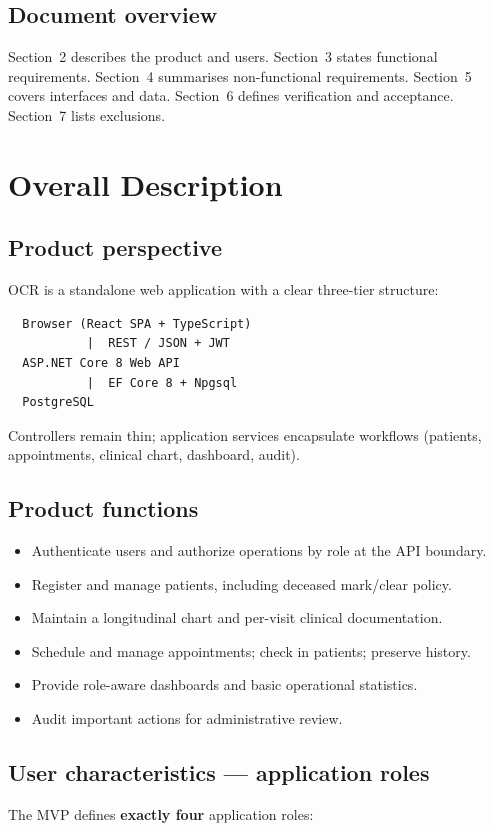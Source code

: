 \documentclass[11pt,a4paper]{article}
\begin{document}
\subsection{Document overview}
Section~2 describes the product and users. Section~3 states functional requirements. Section~4 summarises non-functional requirements. Section~5 covers interfaces and data. Section~6 defines verification and acceptance. Section~7 lists exclusions.

\section{Overall Description}

\subsection{Product perspective}
OCR is a standalone web application with a clear three-tier structure:

\begin{verbatim}
  Browser (React SPA + TypeScript)
           |  REST / JSON + JWT
  ASP.NET Core 8 Web API
           |  EF Core 8 + Npgsql
  PostgreSQL
\end{verbatim}

Controllers remain thin; application services encapsulate workflows (patients, appointments, clinical chart, dashboard, audit).

\subsection{Product functions}
\begin{itemize}
  \item Authenticate users and authorize operations by role at the API boundary.
  \item Register and manage patients, including deceased mark/clear policy.
  \item Maintain a longitudinal chart and per-visit clinical documentation.
  \item Schedule and manage appointments; check in patients; preserve history.
  \item Provide role-aware dashboards and basic operational statistics.
  \item Audit important actions for administrative review.
\end{itemize}

\subsection{User characteristics --- application roles}
The MVP defines \textbf{exactly four} application roles:
\end{document}
